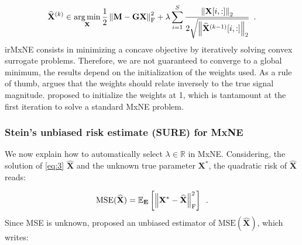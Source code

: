 \begin{equation} \label{eq:5}
    \widehat{\mathbf{X}}^{(k)}
    \in
    \operatorname*{arg\,min}_{\mathbf{X}}
    \frac{1}{2}\left \lVert \mathbf{M - GX} \right \rVert^2_{\text{F}}
    + \lambda \sum_{i=1}^{S} 
    \frac{\left \lVert \mathbf{X}[i,:] \right \rVert_2}
    {2 \sqrt{\left \lVert \widehat{\mathbf{X}}^{(k-1)}[i,:] \right \rVert_2}}
    \enspace .
\end{equation}
%
irMxNE consists in minimizing a concave objective by iteratively solving convex surrogate problems. Therefore, we are not guaranteed to
converge to a global minimum, the results depend on the initialization of the weights used. As a rule of thumb, \cite{Candes_Wakin_Boyd08} argues
that the weights should relate inversely to the true signal magnitude. \cite{Strohmeier_Bekhti_Haueisen_Gramfort_2016} proposed to initialize
the weights at 1, which is tantamount at the first iteration to solve a standard MxNE problem.

\subsubsection{Stein's unbiased risk estimate (SURE) for MxNE}

We now explain how to automatically select $\lambda \in \mathbb{R}$ in MxNE. Considering, the solution of 
\eqref{eq:3} $\widehat{\mathbf{X}}$ and the unknown true parameter $\mathbf{X}^*$, the quadratic risk of $\widehat{\mathbf{X}}$
reads:

\begin{equation} \label{eq:6}
    \text{MSE}(\widehat{\mathbf{X}})
    = \mathbb{E}_{\mathbf{E}}
    \left[
        \left \lVert 
            \mathbf{X}^* - \widehat{\mathbf{X}}
         \right \rVert_{\text{F}}^2
    \right]
    \enspace .
\end{equation}
%
Since MSE is unknown, \cite{Stein81} proposed an unbiased estimator of $\text{MSE}(\widehat{\mathbf{X}})$,
which writes:

